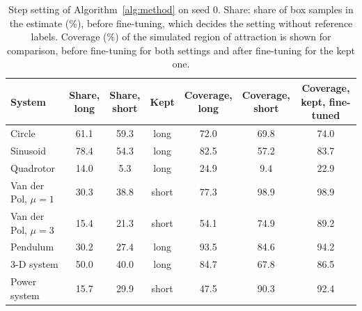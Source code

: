 \begin{table}[ht]
\centering\small
\caption{Step setting of Algorithm~\ref{alg:method} on seed 0. Share: share of box samples in the estimate (\%), before fine-tuning, which decides the setting without reference labels. Coverage (\%) of the simulated region of attraction is shown for comparison, before fine-tuning for both settings and after fine-tuning for the kept one.}
\label{tab:step}
\begin{tabular}{@{}lcccccc@{}}
\toprule
System & \shortstack{Share,\\long} & \shortstack{Share,\\short} & Kept & \shortstack{Coverage,\\long} & \shortstack{Coverage,\\short} & \shortstack{Coverage,\\kept, fine-tuned}\\
\midrule
Circle & 61.1 & 59.3 & long & 72.0 & 69.8 & 74.0\\
Sinusoid & 78.4 & 54.3 & long & 82.5 & 57.2 & 83.7\\
Quadrotor & 14.0 & 5.3 & long & 24.9 & 9.4 & 22.9\\
\midrule
Van der Pol, $\mu=1$ & 30.3 & 38.8 & short & 77.3 & 98.9 & 98.9\\
Van der Pol, $\mu=3$ & 15.4 & 21.3 & short & 54.1 & 74.9 & 89.2\\
Pendulum & 30.2 & 27.4 & long & 93.5 & 84.6 & 94.2\\
3-D system & 50.0 & 40.0 & long & 84.7 & 67.8 & 86.5\\
Power system & 15.7 & 29.9 & short & 47.5 & 90.3 & 92.4\\
\bottomrule
\end{tabular}
\end{table}

